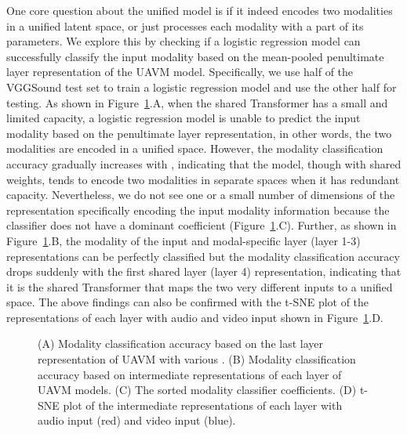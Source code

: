 \documentclass[journal]{IEEEtran}
\newcommand{\squeezeup}{\vspace{-1.6mm}}
\begin{document}
One core question about the unified model is if it indeed encodes two modalities in a unified latent space, or just processes each modality with a part of its parameters. We explore this by checking if a logistic regression model can successfully classify the input modality based on the mean-pooled penultimate layer representation of the UAVM model. Specifically, we use half of the VGGSound test set to train a logistic regression model and use the other half for testing. As shown in Figure~\ref{fig:exp2}.A, when the shared Transformer has a small  and limited capacity, a logistic regression model is unable to predict the input modality based on the penultimate layer representation, in other words, the two modalities are encoded in a unified space. However, the modality classification accuracy gradually increases with , indicating that the model, though with shared weights, tends to encode two modalities in separate spaces when it has redundant capacity. Nevertheless, we do not see one or a small number of dimensions of the representation specifically encoding the input modality information because the classifier does not have a dominant coefficient (Figure~\ref{fig:exp2}.C). Further, as shown in Figure~\ref{fig:exp2}.B, the modality of the input and modal-specific layer (layer 1-3) representations can be perfectly classified but the modality classification accuracy drops suddenly with the first shared layer (layer 4) representation, indicating that it is the shared Transformer that maps the two very different inputs to a unified space. The above findings can also be confirmed with the t-SNE plot of the representations of each layer with audio and video input shown in Figure~\ref{fig:exp2}.D.

\begin{figure}[t]
\squeezeup\squeezeup

\vspace{-1.0em}
\caption{(A) Modality classification accuracy based on the last layer representation of UAVM with various . (B) Modality classification accuracy based on intermediate representations of each layer of UAVM models. (C) The sorted modality classifier coefficients. (D) t-SNE plot of the intermediate representations of each layer with audio input (red) and video input (blue). }
\label{fig:exp2}
\vspace{-1.0em}
\end{figure}
\end{document}
